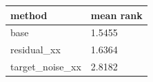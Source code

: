 \begin{tabular}{ll}
\toprule
method & mean rank \\
\midrule
base & 1.5455 \\
residual\_xx & 1.6364 \\
target\_noise\_xx & 2.8182 \\
\bottomrule
\end{tabular}
